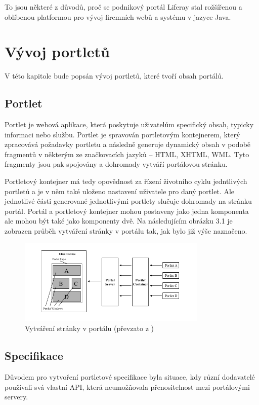 \documentclass{fithesis}
\begin{document}
To jsou některé z důvodů, proč se podnikový portál Liferay stal rožšířenou a oblíbenou platformou pro vývoj firemních webů a systému v jazyce Java.

\chapter{Vývoj portletů}
V této kapitole bude popsán vývoj portletů, které tvoří obsah portálů.

\section{Portlet}
Portlet je webová aplikace, která poskytuje uživatelům specifický obsah, typicky informaci nebo službu. Portlet je spravován portletovým kontejnerem, který zpracovává požadavky portletu a následně generuje dynamický obsah v podobě fragmentů v některým ze značkovacích jazyků -- HTML, XHTML, WML.  Tyto fragmenty jsou pak spojovány a dohromady vytváří portálovou stránku.

Portletový kontejner má tedy opovědnost za řízení životního cyklu jedntlivých portletů a je v něm také uloženo nastavení uživatele pro daný portlet. Ale jednotlivé části generované jednotlivými portlety slučuje dohromady na stránku portál. Portál a portletový kontejner mohou postaveny jako jedna komponenta ale mohou být také jako komponenty dvě. Na následujícím obrázku 3.1 je zobrazen průběh vytváření stránky v portálu tak, jak bylo již výše naznačeno.

\begin{figure}[htp]
\centering
\includegraphics[width=340px]{images/vytvareni_stranky_v_portalu.png}
\caption{Vytváření stránky v portálu (převzato z \cite{jsr-286})}
\end{figure}

\section{Specifikace}
Důvodem pro vytvoření portletové specifikace byla situace, kdy různí dodavatelé používali svá vlastní API, která neumožňovala přenositelnost mezi portálovými servery.
\end{document}
